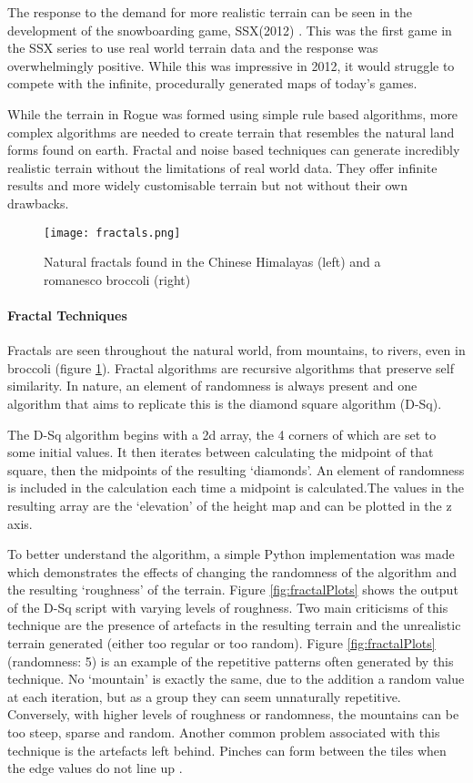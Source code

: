 \documentclass[a4paper]{report}
\begin{document}
The response to the demand for more realistic terrain can be seen in the development of the snowboarding game, SSX(2012) \cite{SSX}. This was the first game in the SSX series to use real world terrain data and the response was overwhelmingly positive. While this was impressive in 2012, it would struggle to compete with the infinite, procedurally generated maps of today's games.

While the terrain in Rogue was formed using simple rule based algorithms, more complex algorithms are needed to create terrain that resembles the natural land forms found on earth. Fractal and noise based techniques can generate incredibly realistic terrain without the limitations of real world data. They offer infinite results and more widely customisable terrain but not without their own drawbacks.

\begin{figure}[H]
    \centering
        \texttt{[image: fractals.png]}
        \caption{Natural fractals found in the Chinese Himalayas (left) and a romanesco broccoli (right)}
        \label{fig:fractals}
\end{figure}

\paragraph{Fractal Techniques}

Fractals are seen throughout the natural world, from mountains, to rivers, even in broccoli (figure \ref{fig:fractals}). Fractal algorithms are recursive algorithms that preserve self similarity. In nature, an element of randomness is always present and one algorithm that aims to replicate this is the diamond square algorithm (D-Sq).

The D-Sq algorithm begins with a 2d array, the 4 corners of which are set to some initial values. It then iterates between calculating the midpoint of that square, then the midpoints of the resulting `diamonds'. An element of randomness is included in the calculation each time a midpoint is calculated.The values in the resulting array are the `elevation' of the height map and can be plotted in the z axis.

To better understand the algorithm, a simple Python implementation was made which demonstrates the effects of changing the randomness of the algorithm and the resulting `roughness' of the terrain. Figure \ref{fig:fractalPlots} shows the output of the D-Sq script with varying levels of roughness. Two main criticisms of this technique are the presence of artefacts in the resulting terrain and the unrealistic terrain generated (either too regular or too random)\cite{Dsq}. Figure \ref{fig:fractalPlots}(randomness: 5) is an example of the repetitive patterns often generated by this technique. No `mountain' is exactly the same, due to the addition a random value at each iteration, but as a group they can seem unnaturally repetitive. Conversely, with higher levels of roughness or randomness, the mountains can be too steep, sparse and random. Another common problem associated with this technique is the artefacts left behind. Pinches can form between the tiles when the edge values do not line up \cite{proGen}.
\end{document}
